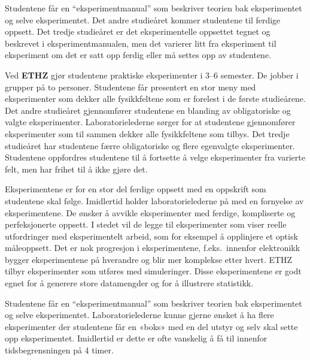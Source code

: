 \documentclass{article}
\begin{document}
Studentene får en ``eksperimentmanual'' som beskriver teorien bak eksperimentet og selve eksperimentet. Det andre studieåret kommer studentene til ferdige oppsett. Det tredje studieåret er det eksperimentelle oppsettet tegnet og beskrevet i eksperimentmanualen, men det varierer litt fra eksperiment til eksperiment om det er satt opp ferdig eller må settes opp av studentene.

Ved \textbf{ETHZ} gjør studentene praktiske eksperimenter i 3--6 semester. De jobber i grupper på to personer. Studentene får presentert en stor meny med eksperimenter som dekker alle fysikkfeltene som er forelest i de første studieårene. Det andre studieåret gjennomfører studentene en blanding av obligatoriske og valgte eksperimenter. Laboratorielederne sørger for at studentene gjennomfører eksperimenter som til sammen dekker alle fysikkfeltene som tilbys.  Det tredje studieåret har studentene færre obligatoriske og flere egenvalgte eksperimenter. Studentene oppfordres studentene til å fortsette å velge eksperimenter fra varierte felt, men har frihet til å ikke gjøre det.

Eksperimentene er for en stor del ferdige oppsett med en oppskrift som studentene skal følge. Imidlertid holder laboratorielederne på med en fornyelse av eksperimentene. De ønsker å avvikle eksperimenter med ferdige, kompliserte og perfeksjonerte oppsett. I stedet vil de legge til eksperimenter som viser reelle utfordringer med eksperimentelt arbeid, som for eksempel å opplinjere et optisk måleoppsett. Det er nok progresjon i eksperimentene, f.eks.~innenfor elektronikk bygger eksperimentene på hverandre og blir mer komplekse etter hvert. ETHZ tilbyr eksperimenter som utføres med simuleringer. Disse eksperimentene er godt egnet for å generere store datamengder og for å illustrere statistikk.

Studentene får en ``eksperimentmanual'' som beskriver teorien bak eksperimentet og selve eksperimentet. Laboratorielederne kunne gjerne ønsket å ha flere eksperimenter der studentene får en «boks» med en del utstyr og selv skal sette opp eksperimentet. Imidlertid er dette er ofte vanskelig å få til innenfor tidsbegrensningen på 4 timer.
\end{document}
